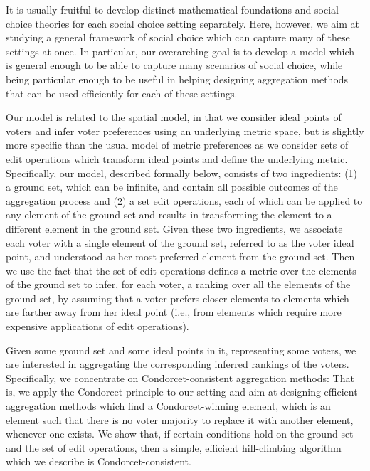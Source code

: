 \documentclass[sigconf]{aamas}  %
\begin{document}
It is usually fruitful to develop distinct mathematical foundations and social choice theories for each social choice setting separately.
Here, however, we aim at studying a general framework of social choice which can capture many of these settings at once.
In particular, our overarching goal is to develop a model which is general enough to be able to capture many scenarios of social choice,
while being particular enough to be useful in helping designing aggregation methods that can be used efficiently for each of these settings.

Our model is related to the spatial model, in that we consider ideal points of voters and infer voter preferences using an underlying metric space,
but is slightly more specific than the usual model of metric preferences as we consider sets of edit operations which transform ideal points and define the underlying metric.
Specifically, our model, described formally below, consists of two ingredients:
  (1) a ground set, which can be infinite, and contain all possible outcomes of the aggregation process
  and
  (2) a set edit operations, each of which can be applied to any element of the ground set and results in transforming the element to a different element in the ground set.
Given these two ingredients, we associate each voter with a single element of the ground set, referred to as the voter ideal point, and understood as her most-preferred element from the ground set.
Then we use the fact that the set of edit operations defines a metric over the elements of the ground set to infer, for each voter, a ranking over all the elements of the ground set,
by assuming that a voter prefers closer elements to elements which are farther away from her ideal point (i.e., from elements which require more expensive applications of edit operations).

Given some ground set and some ideal points in it, representing some voters, we are interested in aggregating the corresponding inferred rankings of the voters.
Specifically, we concentrate on Condorcet-consistent aggregation methods:
  That is, we apply the Condorcet principle to our setting and aim at designing efficient aggregation methods which find a Condorcet-winning element,
  which is an element such that there is no voter majority to replace it with another element, whenever one exists.
We show that, if certain conditions hold on the ground set and the set of edit operations,
then a simple, efficient hill-climbing algorithm which we describe is Condorcet-consistent.
  
\end{document}
